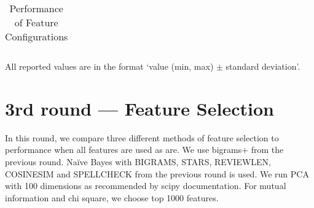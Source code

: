 \begin{table}[h!]
\begin{tabular}{lr@{~}r@{~}rr@{~}r@{~}r}
\bottomrule
\end{tabular}






\caption{Performance of Feature Configurations}\label{tab:feat_perf}
All reported values are in the format `value (min, max) $\pm$ standard deviation'.
\end{table}


\section{3rd round --- Feature Selection}

In this round, we compare three different methods of feature selection to performance when all features are used as are.
We use bigrams+ from the previous round.
Na\"{i}ve Bayes with BIGRAMS, STARS, REVIEWLEN, COSINESIM and SPELLCHECK from the previous round is used.
We run PCA with 100 dimensions as recommended by scipy documentation.
For mutual information and chi square, we choose top 1000 features.

